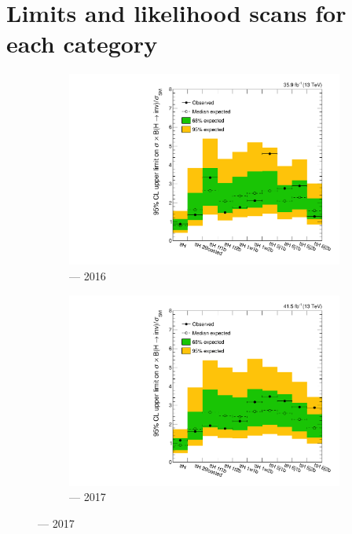 \clearpage




\section{Limits and likelihood scans for each category}
\label{sec:limits_likelihoods_cats_supplementary}

\begin{figure}[htbp]
    \centering
    \begin{subfigure}[b]{0.45\textwidth}
        \includegraphics[width=\textwidth]{chapters/higgstoinv/figures/limits/ttH/limit_2016_ttH.pdf}
        \caption{\ttH --- 2016}
    \end{subfigure}
    \hfill
    \begin{subfigure}[b]{0.45\textwidth}
        \includegraphics[width=\textwidth]{chapters/higgstoinv/figures/limits/ttH/limit_2017_ttH.pdf}
        \caption{\ttH --- 2017}
    \end{subfigure}


\end{figure}
